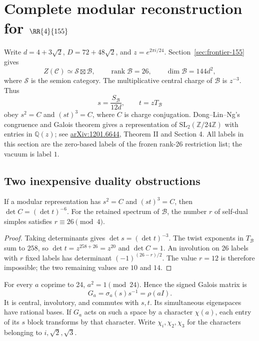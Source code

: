\section{Complete modular reconstruction for \texorpdfstring{$\RR{4}{155}$}{R6\_4\_155}}\label{sec:155-complete-modular}

Write $d=4+3\sqrt2$, $D=72+48\sqrt2$, and $z=e^{2\pi i/24}$.
Section~\ref{sec:frontier-155} gives
\[
 Z(\mathcal C)\simeq\mathcal S\boxtimes\mathcal B,
 \qquad \operatorname{rank}\mathcal B=26,\qquad
 \dim\mathcal B=144d^2,
\]
where $\mathcal S$ is the semion category. The multiplicative central
charge of $\mathcal B$ is $z^{-3}$. Thus
\[
 s=\frac{S_{\mathcal B}}{12d},\qquad t=zT_{\mathcal B}
\]
obey $s^2=C$ and $(st)^3=C$, where $C$ is charge conjugation.
Dong--Lin--Ng's congruence and Galois theorem gives a representation of
$\mathrm{SL}_2(\mathbb Z/24\mathbb Z)$ with entries in
$\mathbb Q(z)$; see \href{https://arxiv.org/abs/1201.6644}{arXiv:1201.6644},
Theorem II and Section 4. All labels in this section are the zero-based
labels of the frozen rank-26 restriction list; the vacuum is label $1$.

\subsection{Two inexpensive duality obstructions}

\begin{lemma}
If a modular representation has $s^2=C$ and $(st)^3=C$, then
$\det C=(\det t)^{-6}$.
For the retained spectrum of $\mathcal B$, the number $r$ of self-dual
simples satisfies $r\equiv26\pmod4$.
\end{lemma}
\begin{proof}
Taking determinants gives $\det s=(\det t)^{-3}$.
The twist exponents in $T_{\mathcal B}$ sum to $258$, so
$\det t=z^{258+26}=z^{20}$ and $\det C=1$.
An involution on 26 labels with $r$ fixed labels has determinant
$(-1)^{(26-r)/2}$. The value $r=12$ is therefore
impossible; the two remaining values are $10$ and $14$.
\end{proof}

For every $a$ coprime to 24, $a^2=1\pmod{24}$. Hence the signed Galois
matrix is
\[
 G_a=\sigma_a(s)s^{-1}=\rho(aI).
\]
It is central, involutory, and commutes with $s,t$. Its simultaneous
eigenspaces have rational bases. If $G_a$ acts on such a space by a
character $\chi(a)$, each entry of its $s$ block transforms by that
character. Write $\chi_i,\chi_2,\chi_3$ for the characters belonging
to $i,\sqrt2,\sqrt3$.

